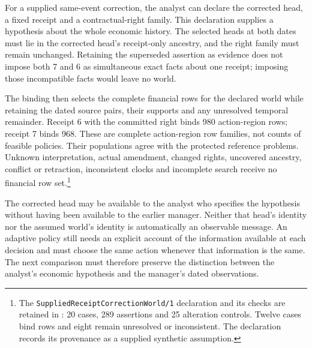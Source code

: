For a supplied same-event correction, the analyst can declare the corrected head, a fixed receipt and a contractual-right family. This declaration supplies a hypothesis about the whole economic history. The selected heads at both dates must lie in the corrected head's receipt-only ancestry, and the right family must remain unchanged. Retaining the superseded assertion as evidence does not impose both 7 and 6 as simultaneous exact facts about one receipt; imposing those incompatible facts would leave no world.

The binding then selects the complete financial rows for the declared world while retaining the dated source pairs, their supports and any unresolved temporal remainder. Receipt 6 with the committed right binds 980 action-region rows; receipt 7 binds 968. These are complete action-region row families, not counts of feasible policies. Their populations agree with the protected reference problems. Unknown interpretation, actual amendment, changed rights, uncovered ancestry, conflict or retraction, inconsistent clocks and incomplete search receive no financial row set.\footnote{The \texttt{SuppliedReceiptCorrectionWorld/1} declaration and its checks are retained in : 20 cases, 289 assertions and 25 alteration controls. Twelve cases bind rows and eight remain unresolved or inconsistent. The declaration records its provenance as a supplied synthetic assumption.}

The corrected head may be available to the analyst who specifies the hypothesis without having been available to the earlier manager. Neither that head's identity nor the assumed world's identity is automatically an observable message. An adaptive policy still needs an explicit account of the information available at each decision and must choose the same action whenever that information is the same. The next comparison must therefore preserve the distinction between the analyst's economic hypothesis and the manager's dated observations.
